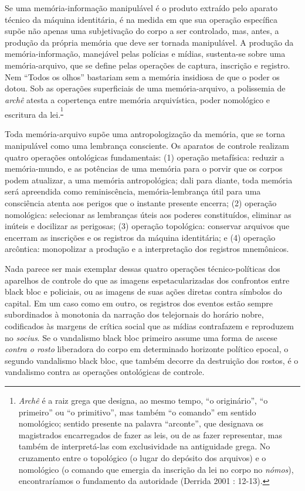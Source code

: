Se uma memória-informação manipulável é o produto extraído pelo aparato
técnico da máquina identitária, é na medida em que sua operação
específica supõe não apenas uma subjetivação do corpo a ser controlado,
mas, antes, a produção da própria memória que deve ser tornada
manipulável. A produção da memória-informação, manejável pelas polícias
e mídias, sustenta-se sobre uma memória-arquivo, que se define pelas
operações de captura, inscrição e registro. Nem ``Todos os olhos''
bastariam sem a memória insidiosa de que o poder os dotou. Sob as
operações superficiais de uma memória-arquivo, a polissemia de
\emph{archê} atesta a copertença entre memória arquivística, poder
nomológico e escritura da lei.\textsuperscript{\footnote{\emph{Archê }é
  a raiz grega que designa, ao mesmo tempo, ``o originário'', ``o
  primeiro'' ou ``o primitivo'', mas também ``o comando'' em sentido
  nomológico; sentido presente na palavra ``arconte'', que designava os
  magistrados encarregados de fazer as leis, ou de as fazer representar,
  mas também de interpretá-las com exclusividade na antiguidade grega.
  No cruzamento entre o topológico (o lugar do depósito dos arquivos) e
  o nomológico (o comando que emergia da inscrição da lei no corpo no
  \emph{nómos}), encontraríamos o fundamento da autoridade (Derrida 2001
  : 12-13).}}

Toda memória-arquivo supõe uma antropologização da memória, que se torna
manipulável como uma lembrança consciente. Os aparatos de controle
realizam quatro operações ontológicas fundamentais: (1) operação
metafísica: reduzir a memória-mundo, e as potências de uma memória para
o porvir que os corpos podem atualizar, a uma memória antropológica;
dali para diante, toda memória será apreendida como reminiscência,
memória-lembrança útil para uma consciência atenta aos perigos que o
instante presente encerra; (2) operação nomológica: selecionar as
lembranças úteis aos poderes constituídos, eliminar as inúteis e
docilizar as perigosas; (3) operação topológica: conservar arquivos que
encerram as inscrições e os registros da máquina identitária; e (4)
operação arcôntica: monopolizar a produção e a interpretação dos
registros mnemônicos.

Nada parece ser mais exemplar dessas quatro operações técnico-políticas
dos aparelhos de controle do que as imagens espetacularizadas dos
confrontos entre black bloc e policiais, ou as imagens de suas ações
diretas contra símbolos do capital. Em um caso como em outro, os
registros dos eventos estão sempre subordinados à monotonia da narração
dos telejornais do horário nobre, codificados às margens de crítica
social que as mídias contrafazem e reproduzem no \emph{socius}. Se o
vandalismo black bloc primeiro assume uma forma de ascese \emph{contra o
rosto} liberadora do corpo em determinado horizonte político epocal, o
segundo vandalismo black bloc, que também decorre da destruição dos
rostos, é o vandalismo contra as operações ontológicas de controle.

